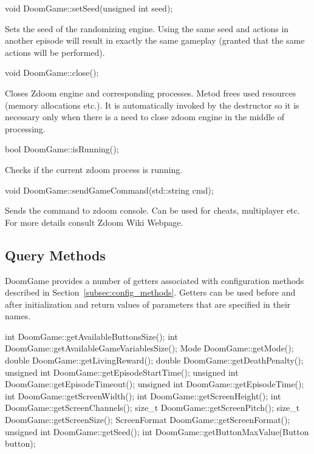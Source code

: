 \vspace{20pt}
\begin{clinee}
	void DoomGame::setSeed(unsigned int seed);
\end{clinee}

	Sets the seed of the randomizing engine. Using the same seed and actions in another episode will result in exactly the same gameplay (granted that the same actions will be performed).


\vspace{20pt}
\begin{clinee}
	void DoomGame::close();
\end{clinee}
	Closes Zdoom engine and corresponding processes. Metod frees used resources (memory allocations etc.). It is automatically invoked by the destructor so it is necessary only when there is a need to close zdoom engine in the middle of processing.


\vspace{20pt}
\begin{clinee}
	bool DoomGame::isRunning();
\end{clinee}
	Checks if the current zdoom process is running.


\vspace{20pt}
\begin{clinee}
	void DoomGame::sendGameCommand(std::string cmd);
\end{clinee}
	Sends the command to zdoom console. Can be used for cheats, multiplayer etc. For more details consult Zdoom Wiki Webpage\cite{zdoom-wiki}.

\vspace{20pt}
\subsection{Query Methods}

DoomGame provides a number of getters associated with configuration methods described in Section~\ref{subsec:config_methods}. Getters can be used before and after initialization and return values of parameters that are specified in their names.

\vspace{20pt}
\begin{clinee}
int DoomGame::getAvailableButtonsSize();
int DoomGame::getAvailableGameVariablesSize();
Mode DoomGame::getMode();
double DoomGame::getLivingReward();
double DoomGame::getDeathPenalty();
unsigned int DoomGame::getEpisodeStartTime();
unsigned int DoomGame::getEpisodeTimeout();
unsigned int DoomGame::getEpisodeTime();
int DoomGame::getScreenWidth();
int DoomGame::getScreenHeight();
int DoomGame::getScreenChannels();
size_t DoomGame::getScreenPitch();
size_t DoomGame::getScreenSize();
ScreenFormat DoomGame::getScreenFormat();
unsigned int DoomGame::getSeed();
int DoomGame::getButtonMaxValue(Button button);
\end{clinee}


